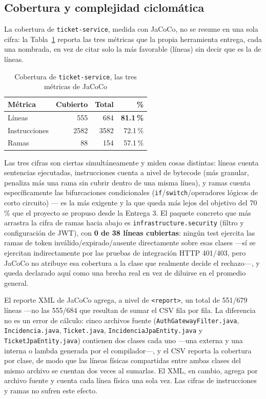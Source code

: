 \subsection{Cobertura y complejidad ciclomática}

La cobertura de \texttt{ticket-service}, medida con JaCoCo, no se resume en una sola cifra:
la Tabla~\ref{tab:cobertura-completa} reporta las tres métricas que la propia herramienta
entrega, cada una nombrada, en vez de citar solo la más favorable (líneas) sin decir que es la
de líneas.

\begin{table}[H]
\centering
\caption{Cobertura de \texttt{ticket-service}, las tres métricas de JaCoCo}
\label{tab:cobertura-completa}
\begin{tabular}{@{}lrrr@{}}
\toprule
\textbf{Métrica} & \textbf{Cubierto} & \textbf{Total} & \textbf{\%} \\
\midrule
Líneas & 555 & 684 & \textbf{81.1\,\%} \\
Instrucciones & 2582 & 3582 & 72.1\,\% \\
Ramas & 88 & 154 & 57.1\,\% \\
\bottomrule
\end{tabular}
\end{table}

Las tres cifras son ciertas simultáneamente y miden cosas distintas: líneas cuenta sentencias
ejecutadas, instrucciones cuenta a nivel de bytecode (más granular, penaliza más una rama sin
cubrir dentro de una misma línea), y ramas cuenta específicamente las bifurcaciones
condicionales (\texttt{if}/\texttt{switch}/operadores lógicos de corto circuito) — es la más
exigente y la que queda más lejos del objetivo del 70\,\% que el proyecto se propuso desde la
Entrega 3. El paquete concreto que más arrastra la cifra de ramas hacia abajo es
\texttt{infrastructure.security} (filtro y configuración de JWT), con \textbf{0 de 38 líneas
cubiertas}: ningún test ejercita las ramas de token inválido/expirado/ausente directamente sobre
esas clases —sí se ejercitan indirectamente por las pruebas de integración HTTP 401/403, pero
JaCoCo no atribuye esa cobertura a la clase que realmente decide el rechazo—, y queda declarado
aquí como una brecha real en vez de diluirse en el promedio general.

El reporte XML de JaCoCo agrega, a nivel de \texttt{<report>}, un total de 551/679 líneas —no
las 555/684 que resultan de sumar el CSV fila por fila. La diferencia no es un error de cálculo:
cinco archivos fuente (\texttt{AuthGatewayFilter.java}, \texttt{Incidencia.java},
\texttt{Ticket.java}, \texttt{IncidenciaJpaEntity.java} y \texttt{TicketJpaEntity.java}) contienen
dos clases cada uno —una externa y una interna o lambda generada por el compilador—, y el CSV
reporta la cobertura por clase, de modo que las líneas físicas compartidas entre ambas clases del
mismo archivo se cuentan dos veces al sumarlas. El XML, en cambio, agrega por archivo fuente y
cuenta cada línea física una sola vez. Las cifras de instrucciones y ramas no sufren este efecto.

